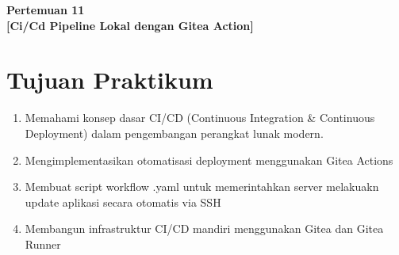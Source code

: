 \documentclass[a4paper,oneside,11pt]{book}
\newcommand{\Pertemuan}{11}
\newcommand{\Materi}{Ci/Cd Pipeline Lokal dengan Gitea Action}
\begin{document}


\renewcommand{\cfttoctitlefont}{\hfill\normalfont\LARGE\bfseries}
\renewcommand{\cftaftertoctitle}{\hfill}
\renewcommand{\cftbeforetoctitleskip}{1em}
\renewcommand{\cftaftertoctitleskip}{1.5em}

\renewcommand{\cftchappresnum}{Bab~}
\renewcommand{\cftchapaftersnum}{.}
\renewcommand{\cftchapnumwidth}{3.5em}
\renewcommand{\cftchapfont}{\bfseries}
\renewcommand{\cftchappagefont}{\bfseries}

\setlength{\cftbeforechapskip}{0.8em} %
\setlength{\cftbeforesecskip}{0.2em}  %
\renewcommand{\cftsecfont}{\normalfont}
\renewcommand{\cftsubsecfont}{\normalfont}

\renewcommand{\contentsname}{\centering Daftar Isi}
\renewcommand{\listfigurename}{\centering Daftar Gambar}
\renewcommand{\lstlistlistingname}{\centering Daftar Kode}

\renewcommand{\cftloftitlefont}{\hfill\normalfont\LARGE\bfseries}
\renewcommand{\cftafterloftitle}{\hfill}

\tableofcontents

\newpage
\listoffigures

\newpage
\lstlistoflistings

\newpage
\begin{center}
\textbf{\LARGE Pertemuan \Pertemuan\\
{[{\Materi}]}}
\end{center}

\section{Tujuan Praktikum}
\begin{enumerate}
  \item Memahami konsep dasar CI/CD (Continuous Integration \& Continuous Deployment) dalam pengembangan perangkat lunak modern.
  \item Mengimplementasikan otomatisasi deployment menggunakan Gitea Actions
  \item Membuat script workflow .yaml untuk memerintahkan server melakuakn update aplikasi secara otomatis via SSH
  \item Membangun infrastruktur CI/CD mandiri menggunakan Gitea dan Gitea Runner
\end{enumerate}
\end{document}
